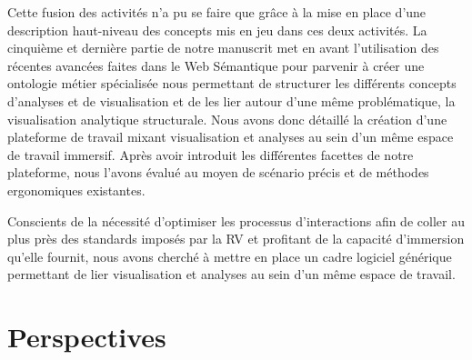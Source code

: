 Cette fusion des activités n'a pu se faire que grâce à la mise en place d'une description haut-niveau des concepts mis en jeu dans ces deux activités. La cinquième et dernière partie de notre manuscrit met en avant l'utilisation des récentes avancées faites dans le Web Sémantique pour parvenir à créer une ontologie métier spécialisée nous permettant de structurer les différents concepts d'analyses et de visualisation et de les lier autour d'une même problématique, la visualisation analytique structurale.
Nous avons donc détaillé la création d'une plateforme de travail mixant visualisation et analyses au sein d'un même espace de travail immersif. Après avoir introduit les différentes facettes de notre plateforme, nous l'avons évalué au moyen de scénario précis et de méthodes ergonomiques existantes.

Conscients de la nécessité d'optimiser les processus d'interactions afin de coller au plus près des standards imposés par la RV et profitant de la capacité d'immersion qu'elle fournit, nous avons cherché à mettre en place un cadre logiciel générique permettant de lier visualisation et analyses au sein d'un même espace de travail.


\section*{Perspectives}




